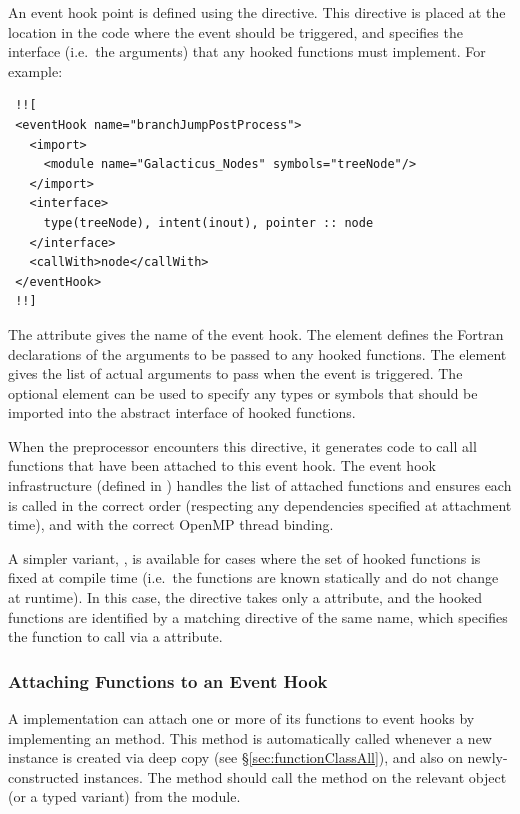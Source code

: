An event hook point is defined using the  directive. This directive is placed at the location in the code where the event should be triggered, and specifies the interface (i.e.\ the arguments) that any hooked functions must implement. For example:

\begin{verbatim}
 !![
 <eventHook name="branchJumpPostProcess">
   <import>
     <module name="Galacticus_Nodes" symbols="treeNode"/>
   </import>
   <interface>
     type(treeNode), intent(inout), pointer :: node
   </interface>
   <callWith>node</callWith>
 </eventHook>
 !!]
\end{verbatim}

The  attribute gives the name of the event hook. The  element defines the Fortran declarations of the arguments to be passed to any hooked functions. The  element gives the list of actual arguments to pass when the event is triggered. The optional  element can be used to specify any types or symbols that should be imported into the abstract interface of hooked functions.

When the preprocessor encounters this directive, it generates code to call all functions that have been attached to this event hook. The event hook infrastructure (defined in ) handles the list of attached functions and ensures each is called in the correct order (respecting any dependencies specified at attachment time), and with the correct OpenMP thread binding.

A simpler variant, , is available for cases where the set of hooked functions is fixed at compile time (i.e.\ the functions are known statically and do not change at runtime). In this case, the directive takes only a  attribute, and the hooked functions are identified by a matching directive of the same name, which specifies the function to call via a  attribute.

\subsubsection{Attaching Functions to an Event Hook}\label{sec:autoHook}

A  implementation can attach one or more of its functions to event hooks by implementing an  method. This method is automatically called whenever a new instance is created via deep copy (see \S\ref{sec:functionClassAll}), and also on newly-constructed instances. The method should call the  method on the relevant  object (or a typed variant) from the  module.

